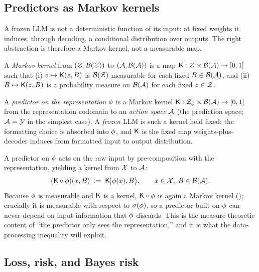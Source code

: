 \subsection{Predictors as Markov kernels}
\label{subsec:pred}

A frozen LLM is not a deterministic function of its input: at fixed weights
it induces, through decoding, a conditional distribution over outputs. The
right abstraction is therefore a Markov kernel, not a measurable map.

\begin{definition}
\label{def:kernel}
A \emph{Markov kernel} from $(\mathcal{Z},\mathcal{B}(\mathcal{Z}))$ to
$(\mathcal{A},\mathcal{B}(\mathcal{A}))$ is a map $\mathsf{K} : \mathcal{Z} \times \mathcal{B}(\mathcal{A})
\to [0,1]$ such that (i) $z \mapsto \mathsf{K}(z, B)$ is
$\mathcal{B}(\mathcal{Z})$-measurable for each fixed $B \in \mathcal{B}(\mathcal{A})$, and (ii)
$B \mapsto \mathsf{K}(z, B)$ is a probability measure on $\mathcal{B}(\mathcal{A})$ for
each fixed $z \in \mathcal{Z}$.
\end{definition}

\begin{definition}
\label{def:predictor}
A \emph{predictor on the representation $\phi$} is a Markov kernel
$\mathsf{K} : \mathcal{Z}_{\phi} \times \mathcal{B}(\mathcal{A}) \to [0,1]$ from the
representation codomain to an \emph{action space} $\mathcal{A}$ (the prediction
space; $\mathcal{A} = \mathcal{Y}$ in the simplest case). A \emph{frozen} LLM is such
a kernel held fixed: the formatting choice is absorbed into $\phi$, and
$\mathsf{K}$ is the fixed map weights-plus-decoder induces from formatted
input to output distribution.
\end{definition}

A predictor on $\phi$ acts on the raw input by pre-composition with the
representation, yielding a kernel from $\mathcal{X}$ to $\mathcal{A}$:
\[
  (\mathsf{K} \circ \phi)(x, B) \;\vcentcolon=\; \mathsf{K}\!\big(\phi(x), B\big),
  \qquad x \in \mathcal{X},\; B \in \mathcal{B}(\mathcal{A}).
\]
Because $\phi$ is measurable and $\mathsf{K}$ is a kernel,
$\mathsf{K} \circ \phi$ is again a Markov kernel
(\citealp[Ch.~2]{cinlar2011probability}); crucially it is measurable with
respect to $\sigma\!\left(\phi\right)$, so a predictor built on $\phi$ can never depend on input
information that $\phi$ discards. This is the measure-theoretic content of
``the predictor only sees the representation,'' and it is what the
data-processing inequality will exploit.

\subsection{Loss, risk, and Bayes risk}
\label{subsec:risk}

